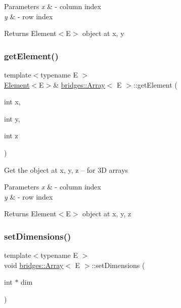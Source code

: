 \begin{DoxyParams}{Parameters}
{\em x} & -\/ column index \\
\hline
{\em y} & -\/ row index\\
\hline
\end{DoxyParams}
\begin{DoxyReturn}{Returns}
Element$<$\+E$>$ object at x, y 
\end{DoxyReturn}
\mbox{\label{classbridges_1_1_array_a7006eeac547c391cb7e8eb19c56ae9f6}} 
\subsubsection{\texorpdfstring{get\+Element()}{getElement()}\hspace{0.1cm}{\footnotesize\ttfamily [3/3]}}
{\footnotesize\ttfamily template$<$typename E $>$ \\
\mbox{\hyperlink{classbridges_1_1_element}{Element}}$<$E$>$\& \mbox{\hyperlink{classbridges_1_1_array}{bridges\+::\+Array}}$<$ E $>$\+::get\+Element (\begin{DoxyParamCaption}\item[{int}]{x,  }\item[{int}]{y,  }\item[{int}]{z }\end{DoxyParamCaption})\hspace{0.3cm}{\ttfamily [inline]}}

Get the object at x, y, z -- for 3D arrays


\begin{DoxyParams}{Parameters}
{\em x} & -\/ column index \\
\hline
{\em y} & -\/ row index\\
\hline
\end{DoxyParams}
\begin{DoxyReturn}{Returns}
Element$<$\+E$>$ object at x, y, z 
\end{DoxyReturn}
\mbox{\label{classbridges_1_1_array_a4e179915ab7820bbafe9b3433656b182}} 
\subsubsection{\texorpdfstring{set\+Dimensions()}{setDimensions()}}
{\footnotesize\ttfamily template$<$typename E $>$ \\
void \mbox{\hyperlink{classbridges_1_1_array}{bridges\+::\+Array}}$<$ E $>$\+::set\+Dimensions (\begin{DoxyParamCaption}\item[{int $\ast$}]{dim }\end{DoxyParamCaption})\hspace{0.3cm}{\ttfamily [inline]}}

